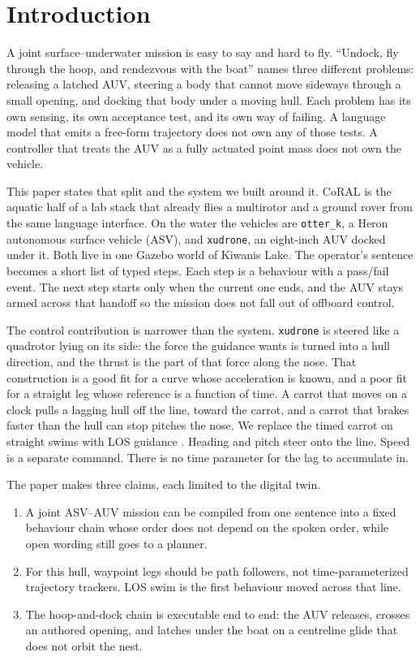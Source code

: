 \documentclass[conference]{IEEEtran}
\def\CoRAL{CoRAL}
\def\otterk{\texttt{otter\_k}}
\def\xudrone{\texttt{xudrone}}
\begin{document}
\section{Introduction}
\label{sec:intro}

A joint surface--underwater mission is easy to say and hard to fly. ``Undock, fly through the hoop, and rendezvous with the boat'' names three different problems: releasing a latched AUV, steering a body that cannot move sideways through a small opening, and docking that body under a moving hull. Each problem has its own sensing, its own acceptance test, and its own way of failing. A language model that emits a free-form trajectory does not own any of those tests. A controller that treats the AUV as a fully actuated point mass does not own the vehicle.

This paper states that split and the system we built around it. \CoRAL{} is the aquatic half of a lab stack that already flies a multirotor and a ground rover from the same language interface. On the water the vehicles are \otterk{}, a Heron autonomous surface vehicle (ASV), and \xudrone{}, an eight-inch AUV docked under it. Both live in one Gazebo world of Kiwanis Lake. The operator's sentence becomes a short list of typed steps. Each step is a behaviour with a pass/fail event. The next step starts only when the current one ends, and the AUV stays armed across that handoff so the mission does not fall out of offboard control.

The control contribution is narrower than the system. \xudrone{} is steered like a quadrotor lying on its side: the force the guidance wants is turned into a hull direction, and the thrust is the part of that force along the nose. That construction is a good fit for a curve whose acceleration is known, and a poor fit for a straight leg whose reference is a function of time. A carrot that moves on a clock pulls a lagging hull off the line, toward the carrot, and a carrot that brakes faster than the hull can stop pitches the nose. We replace the timed carrot on straight swims with LOS guidance \cite{fossen2011,lekkas2014}. Heading and pitch steer onto the line. Speed is a separate command. There is no time parameter for the lag to accumulate in.

The paper makes three claims, each limited to the digital twin.
\begin{enumerate}
\item A joint ASV--AUV mission can be compiled from one sentence into a fixed behaviour chain whose order does not depend on the spoken order, while open wording still goes to a planner.
\item For this hull, waypoint legs should be path followers, not time-parameterized trajectory trackers. LOS swim is the first behaviour moved across that line.
\item The hoop-and-dock chain is executable end to end: the AUV releases, crosses an authored opening, and latches under the boat on a centreline glide that does not orbit the nest.
\end{enumerate}
\end{document}
